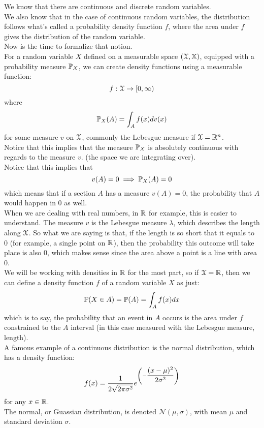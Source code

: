 \documentclass[12pt]{article}
\begin{document}
    We know that there are continuous
    and discrete random variables. \\
    We also know that in the case of continuous
    random variables, the distribution follows
    what's called a probability density 
    function $f$,
    where the area under $f$ gives the
    distribution of the random variable. \\
    Now is the time to formalize that notion. \\

    For a random variable $X$
    defined on a measurable space $(\mathcal{X}, \mathbb{X})$,
    equipped with a probability measure $\mathbb{P}_X$,
    we can create density functions using
    a measurable function:
    \[ f:\mathcal{X} \to [0, \infty) \]
    where
    \[ \mathbb{P}_X(A) = \int_{A}f(x)dv(x) \]
    for some measure $v$ on $\mathcal{X}$,
    commonly the Lebesgue measure
    if $\mathcal{X} = \mathbb{R}^n$. \\
    
    Notice that this implies that the 
    measure $\mathbb{P}_X$ is absolutely
    continuous with regards to the measure $v$.
    (the space we are integrating over). \\
    Notice that this implies that
    \[ v(A) = 0 \implies \mathbb{P}_X(A) = 0 \]
    which means that if a section $A$
    has a measure $v(A) = 0$,
    the probability that $A$ would happen in $0$
    as well. \\
    When we are dealing with real numbers,
    in $\mathbb{R}$ for example,
    this is easier to understand.
    The measure $v$ is the Lebesgue
    measure $\lambda$,
    which describes the length along $\mathcal{X}$.
    So what we are saying is that,
    if the length is so short that it equals
    to 0 (for example, a single point on $\mathbb{R}$),
    then the probability this outcome will take
    place is also 0,
    which makes sense since the area above a point
    is a line with area 0. \\

    We will be working with densities in $\mathbb{R}$
    for the most part,
    so if $\mathcal{X} = \mathbb{R}$,
    then we can define a density function $f$
    of a random variable $X$ as just:
    \[ \mathbb{P}(X \in A) = \mathbb{P}(A) = 
    \int_Af(x)dx \]
    which is to say, the probability
    that an event in $A$ occurs is the area
    under $f$ constrained to the $A$ interval
    (in this case measured with the Lebesgue measure,
    length). \\

    A famous example of a continuous
    distribution is the normal distribution,
    which has a density function:
    \[ f(x) = \dfrac{1}{2\sqrt{2\pi \sigma^2}}
    e^{\left( -\dfrac{(x-\mu)^2}{2\sigma^2} \right)} \]
    for any $x \in \mathbb{R}$. \\
    The normal, or Guassian distribution,
    is denoted $\mathcal{N}(\mu, \sigma)$,
    with mean $\mu$ and standard
    deviation $\sigma$. \\
\end{document}
